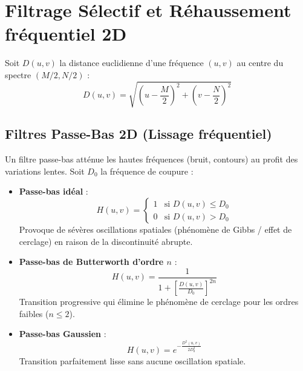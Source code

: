 
\section{Filtrage Sélectif et Réhaussement fréquentiel 2D}

Soit $D(u,v)$ la distance euclidienne d'une fréquence $(u,v)$ au centre du spectre $(M/2, N/2)$ :
\begin{equation}
    D(u,v) = \sqrt{\left(u - \frac{M}{2}\right)^2 + \left(v - \frac{N}{2}\right)^2}
\end{equation}

\subsection{Filtres Passe-Bas 2D (Lissage fréquentiel)}

Un filtre passe-bas atténue les hautes fréquences (bruit, contours) au profit des variations lentes. Soit $D_0$ la fréquence de coupure :
\begin{itemize}
    \item \textbf{Passe-bas idéal} :
        \begin{equation}
            H(u,v) = \begin{cases} 1 & \text{si } D(u,v) \leqslant D_0 \\ 0 & \text{si } D(u,v) > D_0 \end{cases}
        \end{equation}
        Provoque de sévères oscillations spatiales (phénomène de Gibbs / effet de cerclage) en raison de la discontinuité abrupte.
    \item \textbf{Passe-bas de Butterworth d'ordre $n$} :
        \begin{equation}
            H(u,v) = \frac{1}{1 + \left[ \frac{D(u,v)}{D_0} \right]^{2n}}
        \end{equation}
        Transition progressive qui élimine le phénomène de cerclage pour les ordres faibles ($n \leqslant 2$).
    \item \textbf{Passe-bas Gaussien} :
        \begin{equation}
            H(u,v) = e^{-\frac{D^2(u,v)}{2D_0^2}}
        \end{equation}
        Transition parfaitement lisse sans aucune oscillation spatiale.
\end{itemize}

